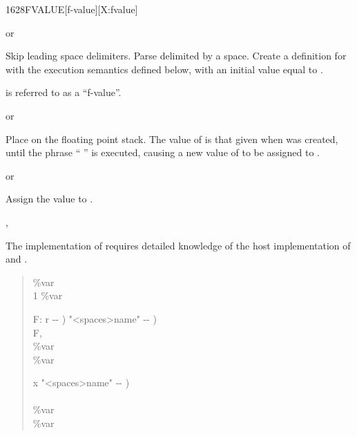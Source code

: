
\vspace*{-0.5ex}
\enlargethispage{10ex}
\begin{worddef}{1628}{FVALUE}[f-value][X:fvalue]
\item {}  or

	Skip leading space delimiters.  Parse  delimited by a
	space.  Create a definition for  with the execution
	semantics defined below, with an initial value equal to .

	 is referred to as a ``f-value''.

\execute[name]
	 or 

	Place  on the floating point stack.  The value of
	 is that given when  was created, until the
	phrase ``  '' is executed, causing
	a new value of  to be assigned to .

	 or 

	Assign the value  to .

\see {}, 

	\begin{implement}
		\dffamily
		The implementation of  requires detailed
		knowledge of the host implementation of  and
		.

		\begin{quote}\ttfamily
			 \%var \\
			\word{:}  1 \%var \word{!} \word{;}

			\word{:}   F: r -{}- )  "<spaces>name" -{}- ) \\
			\tab {} F, \\
			\tab {} \%var       \\
			 \%var \word{!} \word{;}

			\word{:}   x "<spaces>name" -{}- ) \\
			\tab {} \word{,} \\
			\tab {} \%var   ~\word{!}  ~  \\
			 \%var \word{!} \word{;}
		\end{quote}
	\end{implement}


\end{worddef}
